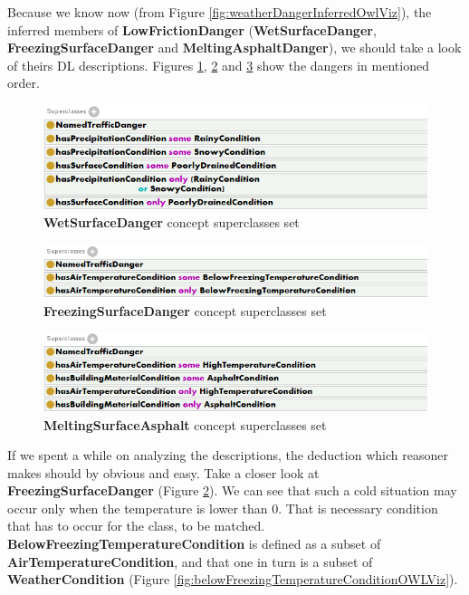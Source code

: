 \noindent Because we know now (from Figure \ref{fig:weatherDangerInferredOwlViz}), the inferred members of \textbf{LowFrictionDanger} (\textbf{WetSurfaceDanger}, \textbf{FreezingSurfaceDanger} and \textbf{MeltingAsphaltDanger}), we should take a look of theirs DL descriptions. Figures \ref{fig:wetSurfaceDanger}, \ref{fig:freezingSurfaceDanger} and \ref{fig:meltingAsphaltDanger} show the dangers in mentioned order.

\medskip

\begin{figure}[htp]
\centering
\includegraphics[scale=0.7]{images/chapter3/WetSurfaceDanger}
\caption{\textbf{WetSurfaceDanger} concept superclasses set}
\label{fig:wetSurfaceDanger}
\end{figure}

\begin{figure}[htp]
\centering
\includegraphics[scale=0.7]{images/chapter3/FreezingSurfaceDanger}
\caption{\textbf{FreezingSurfaceDanger} concept superclasses set}
\label{fig:freezingSurfaceDanger}
\end{figure}

\begin{figure}[htp]
\centering
\includegraphics[scale=0.7]{images/chapter3/MeltingAsphaltDanger}
\caption{\textbf{MeltingSurfaceAsphalt} concept superclasses set}
\label{fig:meltingAsphaltDanger}
\end{figure}

\newpage

\noindent If we spent a while on analyzing the descriptions, the deduction which reasoner makes should by obvious and easy. Take a closer look at \textbf{FreezingSurfaceDanger} (Figure \ref{fig:freezingSurfaceDanger}). We can see that such a cold situation may occur only when the temperature is lower than 0. That is necessary condition that has to occur for the class, to be matched. \textbf{BelowFreezingTemperatureCondition} is defined as a subset of \textbf{AirTemperatureCondition}, and that one in turn is a subset of \textbf{WeatherCondition} (Figure \ref{fig:belowFreezingTemperatureConditionOWLViz}).

